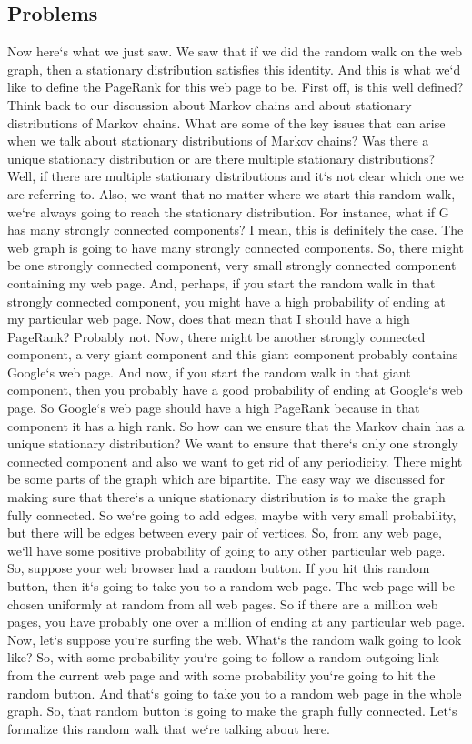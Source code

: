 \subsection{Problems}
Now here`s what we just saw.
We saw that if we did the random walk on the web graph, then a stationary distribution satisfies this identity.
And this is what we`d like to define the PageRank for this web page to be.
First off, is this well defined? Think back to our discussion about Markov chains and about stationary distributions of Markov chains.
What are some of the key issues that can arise when we talk about stationary distributions of Markov chains? Was there a unique stationary distribution or are there multiple stationary distributions? Well, if there are multiple stationary distributions and it`s not clear which one we are referring to.
Also, we want that no matter where we start this random walk, we`re always going to reach the stationary distribution.
For instance, what if G has many strongly connected components? I mean, this is definitely the case.
The web graph is going to have many strongly connected components.
So, there might be one strongly connected component, very small strongly connected component containing my web page.
And, perhaps, if you start the random walk in that strongly connected component, you might have a high probability of ending at my particular web page.
Now, does that mean that I should have a high PageRank? Probably not.
Now, there might be another strongly connected component, a very giant component and this giant component probably contains Google`s web page.
And now, if you start the random walk in that giant component, then you probably have a good probability of ending at Google`s web page.
So Google`s web page should have a high PageRank because in that component it has a high rank.
So how can we ensure that the Markov chain has a unique stationary distribution? We want to ensure that there`s only one strongly connected component and also we want to get rid of any periodicity.
There might be some parts of the graph which are bipartite.
The easy way we discussed for making sure that there`s a unique stationary distribution is to make the graph fully connected.
So we`re going to add edges, maybe with very small probability, but there will be edges between every pair of vertices.
So, from any web page, we`ll have some positive probability of going to any other particular web page.
So, suppose your web browser had a random button.
If you hit this random button, then it`s going to take you to a random web page.
The web page will be chosen uniformly at random from all web pages.
So if there are a million web pages, you have probably one over a million of ending at any particular web page.
Now, let`s suppose you`re surfing the web.
What`s the random walk going to look like? So, with some probability you`re going to follow a random outgoing link from the current web page and with some probability you`re going to hit the random button.
And that`s going to take you to a random web page in the whole graph.
So, that random button is going to make the graph fully connected.
Let`s formalize this random walk that we`re talking about here.

